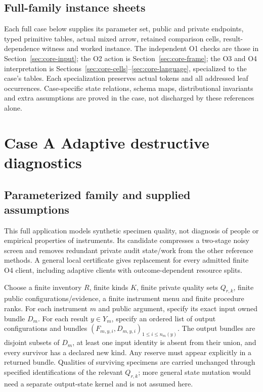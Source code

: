 \documentclass[11pt,a4paper]{article}
\theoremstyle{definition}
\begin{document}
\subsection{Full-family instance sheets}\label{sec:instance-sheet}
Each full case below supplies its parameter set, public and private
endpoints, typed primitive tables, actual mixed arrow, retained comparison
cells, result-dependence witness and worked instance. The independent O1
checks are those in Section~\ref{sec:core-input}; the O2 action is
Section~\ref{sec:core-frame}; the O3 and O4 interpretation is
Sections~\ref{sec:core-cells}--\ref{sec:core-language}, specialized to the
case's tables. Each specialization preserves actual tokens and all
addressed leaf occurrences. Case-specific state relations, schema maps,
distributional invariants and extra assumptions are proved in the case,
not discharged by these references alone.


\section{Case A Adaptive destructive diagnostics}\label{sec:caseA}

\subsection{Parameterized family and supplied assumptions}
This full application models synthetic specimen quality, not diagnosis
of people or empirical properties of instruments. Its candidate compresses
a two-stage noisy screen and removes redundant private audit state/work
from the other reference methods. A general
local certificate gives replacement for every admitted finite O4 client,
including adaptive clients with outcome-dependent resource splits.

Choose a finite inventory $R$, finite kinds $K$, finite private quality
sets $Q_{r,k}$, finite public configurations/evidence, a finite instrument
menu and finite procedure ranks. For each instrument $m$ and public
argument, specify its exact input owned bundle $D_m$. For each result
$y\in Y_m$, specify an ordered list of output configurations and bundles
$(F_{m,y,i},D_{m,y,i})_{1\leq i\leq n_m(y)}$. The output bundles are
disjoint subsets of $D_m$, at least one input identity is absent from
their union, and every survivor has a declared new kind. Any reserve
must appear explicitly in a returned bundle. Qualities of surviving
specimens are carried unchanged through specified identifications of
the relevant $Q_{r,k}$; more general state mutation would need a separate
output-state kernel and is not assumed here.
\end{document}
